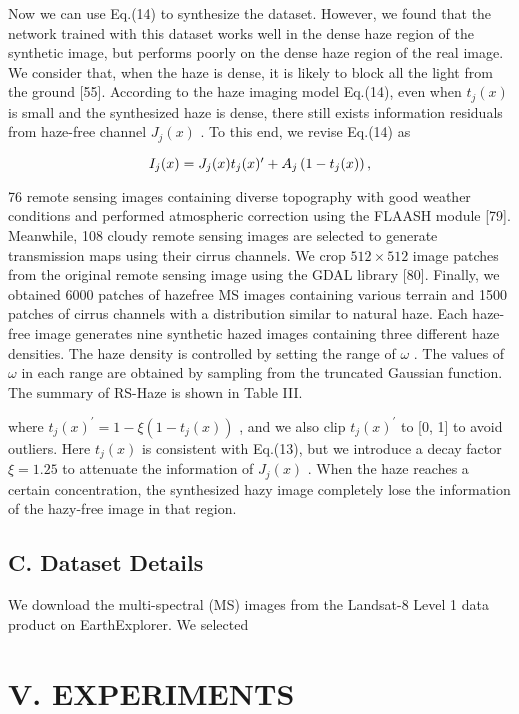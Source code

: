 \documentclass{article}
\begin{document}
Now we can use Eq.(14) to synthesize the dataset. However, we found that the network trained with this dataset works well in the dense haze region of the synthetic image, but performs poorly on the dense haze region of the real image. We consider that, when the haze is dense, it is likely to block all the light from the ground [55]. According to the haze imaging model Eq.(14), even when $t_{j}(x)$ is small and the synthesized haze is dense, there still exists information residuals from haze-free channel $J_{j}(x)$ . To this end, we revise Eq.(14) as


\[
$$$$I_{j}(x)=J_{j}(x)t_{j}(x)^{\prime}+A_{j}\left(1-t_{j}(x)\right),
\]


76 remote sensing images containing diverse topography with good weather conditions and performed atmospheric correction using the FLAASH module [79]. Meanwhile, 108 cloudy remote sensing images are selected to generate transmission maps using their cirrus channels. We crop $512\times512$ image patches from the original remote sensing image using the GDAL library [80]. Finally, we obtained 6000 patches of hazefree MS images containing various terrain and 1500 patches of cirrus channels with a distribution similar to natural haze. Each haze-free image generates nine synthetic hazed images containing three different haze densities. The haze density is controlled by setting the range of $\omega$ . The values of $\omega$ in each range are obtained by sampling from the truncated Gaussian function. The summary of RS-Haze is shown in Table III.


where $t_{j}(x)^{\prime}=1-\xi(1-t_{j}(x))$ , and we also clip $t_{j}(x)^{\prime}$ to [0, 1] to avoid outliers. Here $t_{j}(x)$ is consistent with Eq.(13), but we introduce a decay factor $\xi=1.25$ to attenuate the information of $J_{j}(x)$ . When the haze reaches a certain concentration, the synthesized hazy image completely lose the information of the hazy-free image in that region.


\subsection{C. Dataset Details}


We download the multi-spectral (MS) images from the Landsat-8 Level 1 data product on EarthExplorer. We selected


\section{V. EXPERIMENTS}
\end{document}
